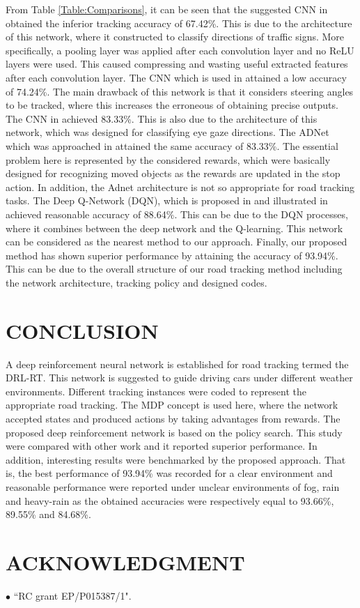 \documentclass[a4paper,twoside]{article}
\begin{document}
From Table \ref{Table:Comparisons}, it can be seen that the suggested CNN in \cite{Karaduman2017Deep} obtained the inferior tracking accuracy of 67.42\%. This is due to the architecture of this network, where it constructed to classify directions of traffic signs. More specifically, a pooling layer was applied after each convolution layer and no ReLU layers were used. This caused compressing and wasting useful extracted features after each convolution layer. The CNN which is used in \cite{bojarski2016end} attained a low accuracy of 74.24\%. The main drawback of this network is that it considers steering angles to be tracked, where this increases the erroneous of obtaining precise outputs. The CNN in \cite{George2016Real} achieved 83.33\%. This is also due to the architecture of this network, which was designed for classifying eye gaze directions. The ADNet which was approached in \cite{Yun2017Action,Yun2018Action} attained the same accuracy of 83.33\%. 
The essential problem here is represented by the considered rewards, which were basically designed %
for recognizing moved objects as the rewards are updated in the stop action. In addition, the Adnet architecture is not so appropriate for road tracking tasks. The Deep Q-Network (DQN), which is proposed in \cite{mnih2015human} and illustrated in \cite{arulkumaran2017brief} achieved reasonable accuracy of 88.64\%. This can be due to the DQN processes, where it combines between the deep network and the Q-learning. This network can be considered as the nearest method to our approach. Finally, our proposed method has shown superior performance by attaining the accuracy of 93.94\%. This can be due to the overall structure of our road tracking method including the network architecture, tracking policy and designed codes.

\section{\uppercase{Conclusion}}
A deep reinforcement neural network is established for road tracking termed the DRL-RT. This network is suggested to guide driving cars under different weather environments. Different tracking instances were coded to represent the appropriate road tracking. The MDP concept is used here, where the network accepted states and produced actions by taking advantages from rewards. The proposed deep reinforcement network is based on the policy search. This study were compared with other work and it reported superior performance. In addition, interesting results were benchmarked by the proposed approach. That is, the best performance of 93.94\% was recorded for a clear environment and reasonable performance were reported under unclear environments of fog, rain and heavy-rain as the obtained accuracies were respectively equal to 93.66\%, 89.55\% and 84.68\%. 

\section*{\uppercase{Acknowledgment}}
$\bullet$ ``RC grant EP/P015387/1".
	
	
	
	{\small
		}
	
\end{document}
